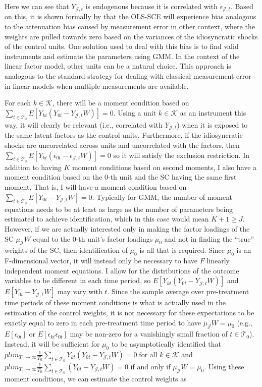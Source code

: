 \documentclass{article}
\begin{document}
Here we can see that $Y_{\mathcal{J},t}$ is endogenous because it is correlated with $\epsilon_{\mathcal{J},t}$. Based on this, it is shown formally by \cite{ImperfectFit} that the OLS-SCE will experience bias analogous to the attenuation bias caused by measurement error in other context, where the weights are pulled towards zero based on the variances of the idiosyncratic shocks of the control units. One solution used to deal with this bias is to find valid instruments and estimate the parameters using GMM. In the context of the linear factor model, other units can be a natural choice. This approach is analogous to the standard strategy for dealing with classical measurement error in linear models when multiple measurements are available.
\par
For each $k \in \mathcal{K}$, there will be a moment condition based on $\sum_{t \in \mathcal{T}_0} E[ Y_{kt}(Y_{0t} -  Y_{\mathcal{J},t} W)] = 0$.
Using a unit $k \in \mathcal{K}$ as an instrument this way, it will clearly be relevant (i.e., correlated with $Y_{\mathcal{J},t}$) when it is exposed to the same latent factors as the control units. Furthermore, if the idiosyncratic shocks are uncorrelated across units and uncorrelated with the factors, then $\sum_{t \in \mathcal{T}_0} E[Y_{kt}(\epsilon_{0t} - \epsilon_{\mathcal{J},t}W)] = 0$ so it will satisfy the exclusion restriction. In addition to having $K$ moment conditions based on second moments, I also have a moment condition based on the $0$-th unit and the SC having the same first moment. That is, I will have a moment condition based on $\sum_{t \in \mathcal{T}_0} E[Y_{0t} - Y_{\mathcal{J},t} W] = 0$. Typically for GMM, the number of moment equations needs to be at least as large as the number of parameters being estimated to achieve identification, which in this case would mean $K+1 \geq J$. However, if we are actually interested only in making the factor loadings of the SC $\mu_{\mathcal{J}} W$ equal to the $0$-th unit's factor loadings $\mu_0$ and not in finding the “true” weights of the SC, then identification of $\mu_0$ is all that is required. Since $\mu_0$ is an F-dimensional vector, it will instead only be necessary to have $F$ linearly independent moment equations. I allow for the distributions of the outcome variables to be different in each time period, so $E[ Y_{kt}(Y_{0t} - Y_{\mathcal{J},t} W)]$ and $E[Y_{0t} - Y_{\mathcal{J},t} W]$ may vary with $t$. Since the sample average over pre-treatment time periods of these moment conditions is what is actually used in the estimation of the control weights, it is not necessary for these expectations to be exactly equal to zero in each pre-treatment time period to have $\mu_{\mathcal{J}}W = \mu_0$ (e.g., $E[\epsilon_{0t}]$ or $E[\epsilon_{kt}\epsilon_{0t}]$ may be non-zero for a vanishingly small fraction of $t \in \mathcal{T}_0$). Instead, it will be sufficient for $\mu_0$ to be asymptotically identified that $plim_{T_0 \rightarrow \infty} \frac{1}{T_0} \sum_{t \in \mathcal{T}_0}Y_{kt}(Y_{0t} - Y_{\mathcal{J},t}W) = 0 \; \text{for all } k \in \mathcal{K}$ and $plim_{T_0 \rightarrow \infty} \frac{1}{T_0} \sum_{t \in \mathcal{T}_0} (Y_{0t} - Y_{\mathcal{J},t} W) = 0$ if and only if $\mu_{\mathcal{J}} W = \mu_0$. Using these moment conditions, we can estimate the control weights as
\end{document}
